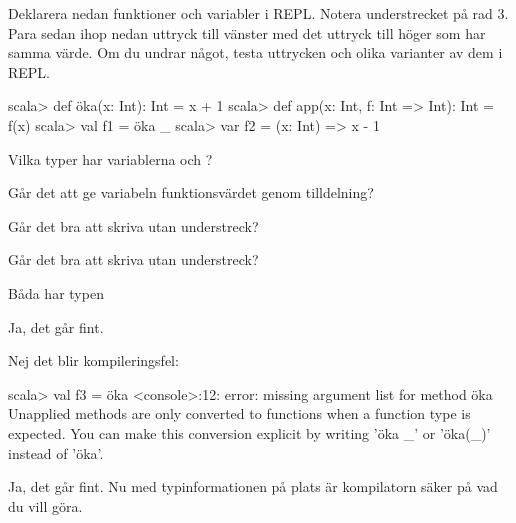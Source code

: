 \Subtask \label{subtask:funcval} Deklarera nedan funktioner och variabler i REPL. Notera understrecket på rad 3. Para sedan ihop nedan uttryck till vänster med det uttryck till höger som har samma värde. Om du undrar något, testa uttrycken och olika varianter av dem i REPL.

\begin{REPL}
scala> def öka(x: Int): Int = x + 1
scala> def app(x: Int, f: Int => Int): Int = f(x)
scala> val f1 = öka _
scala> var f2 = (x: Int) => x - 1
\end{REPL}

\begin{ConceptConnections}

\end{ConceptConnections}


\Subtask Vilka typer har variablerna  och ?

\Subtask Går det att ge variabeln  funktionsvärdet  genom tilldelning?

\Subtask Går det bra att skriva  utan understreck?

\Subtask Går det bra att skriva  utan understreck?

\SOLUTION

\TaskSolved \what

\SubtaskSolved

\begin{ConceptConnections}
  
\end{ConceptConnections}

\SubtaskSolved Båda har typen 

\SubtaskSolved  Ja, det går fint.

\SubtaskSolved  Nej det blir kompileringsfel: \\
\begin{REPL}
scala> val f3 = öka
<console>:12: error: missing argument list for method öka
Unapplied methods are only converted to functions when
a function type is expected. You can make this conversion
explicit by writing 'öka _' or 'öka(_)' instead of 'öka'.
\end{REPL}

\SubtaskSolved  Ja, det går fint. Nu med typinformationen på plats är kompilatorn säker på vad du vill göra.

\QUESTEND




